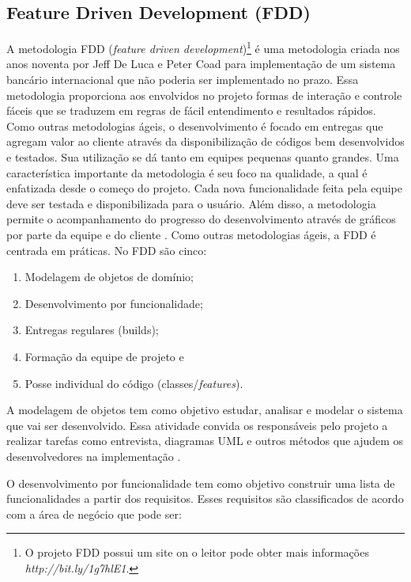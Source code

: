 \subsection{Feature Driven Development (FDD)}

A metodologia FDD (\textit{feature driven development})\footnote{O projeto FDD possui um site on o leitor pode obter mais informações \textit{http://bit.ly/1g7hlE1}.} é uma metodologia criada nos anos noventa por Jeff De Luca e Peter Coad para implementação de um sistema bancário internacional que não poderia ser implementado no prazo. Essa metodologia proporciona aos envolvidos no projeto formas de interação e controle fáceis que se traduzem em regras de fácil entendimento e resultados rápidos. Como outras metodologias ágeis, o desenvolvimento é focado em entregas que agregam valor ao cliente através da disponibilização de códigos bem desenvolvidos e testados. Sua utilização se dá tanto em equipes pequenas quanto grandes. Uma característica importante da metodologia é seu foco na qualidade, a qual é enfatizada desde o começo do projeto. Cada nova funcionalidade feita pela equipe deve ser testada e disponibilizada para o usuário. Além disso, a metodologia permite o acompanhamento do progresso do desenvolvimento através de gráficos por parte da equipe e do cliente \cite{macedo:12}. 
Como outras metodologias ágeis, a FDD é centrada em práticas. No FDD são cinco:

\begin{enumerate}
	\item Modelagem de objetos de domínio;
	\item Desenvolvimento por funcionalidade;
	\item Entregas regulares (builds);
	\item Formação da equipe de projeto e
	\item Posse individual do código (classes/\textit{features}).
\end{enumerate}

A modelagem de objetos tem como objetivo estudar, analisar e modelar o sistema que vai ser desenvolvido. Essa atividade convida os responsáveis pelo projeto a realizar tarefas como entrevista, diagramas UML e outros métodos que ajudem os desenvolvedores na implementação \cite{macedo:12}. 

O desenvolvimento por funcionalidade tem como objetivo construir uma lista de funcionalidades a partir dos requisitos. Esses requisitos são classificados de acordo com a área de negócio que pode ser:

